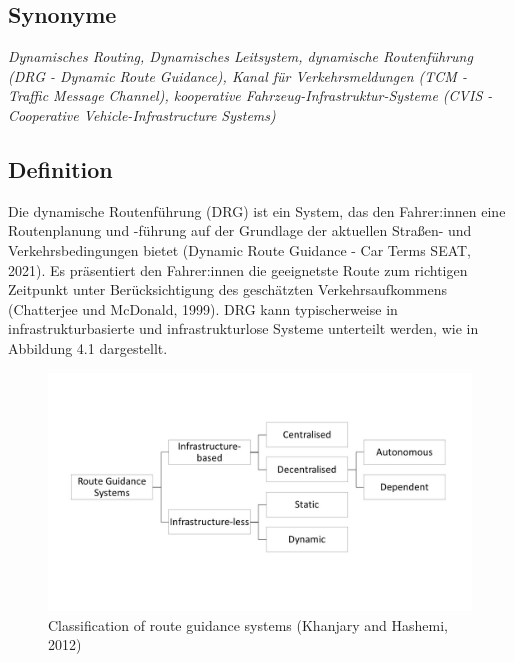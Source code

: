 \documentclass[
]{book}
\begin{document}
\hypertarget{synonyme-12}{%
\subsection*{Synonyme}\label{synonyme-12}}

\emph{Dynamisches Routing, Dynamisches Leitsystem, dynamische Routenführung (DRG - Dynamic Route Guidance), Kanal für Verkehrsmeldungen (TCM - Traffic Message Channel), kooperative Fahrzeug-Infrastruktur-Systeme (CVIS - Cooperative Vehicle-Infrastructure Systems)}

\hypertarget{definition-13}{%
\subsection*{Definition}\label{definition-13}}

Die dynamische Routenführung (DRG) ist ein System, das den Fahrer:innen eine Routenplanung und -führung auf der Grundlage der aktuellen Straßen- und Verkehrsbedingungen bietet (Dynamic Route Guidance - Car Terms \textbar{} SEAT, 2021). Es präsentiert den Fahrer:innen die geeignetste Route zum richtigen Zeitpunkt unter Berücksichtigung des geschätzten Verkehrsaufkommens (Chatterjee und McDonald, 1999). DRG kann typischerweise in infrastrukturbasierte und infrastrukturlose Systeme unterteilt werden, wie in Abbildung 4.1 dargestellt.

\begin{figure}
\includegraphics[width=0.55\linewidth]{image/DRS} \caption{Classification of route guidance systems (Khanjary and Hashemi, 2012)}\label{fig:unnamed-chunk-15}
\end{figure}
\end{document}
